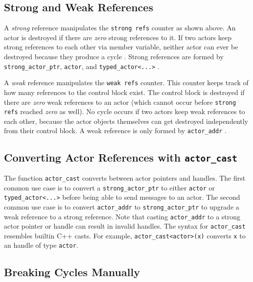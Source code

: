\subsection{Strong and Weak References}

A \emph{strong} reference manipulates the \lstinline^strong refs^ counter as
shown above. An actor is destroyed if there are \emph{zero} strong references
to it. If two actors keep strong references to each other via member variable,
neither actor can ever be destroyed because they produce a cycle
. Strong references are formed by
\lstinline^strong_actor_ptr^, \lstinline^actor^, and
\lstinline^typed_actor<...>^ .

A \emph{weak} reference manipulates the \lstinline^weak refs^ counter. This
counter keeps track of how many references to the control block exist. The
control block is destroyed if there are \emph{zero} weak references to an actor
(which cannot occur before \lstinline^strong refs^ reached \emph{zero} as
well). No cycle occurs if two actors keep weak references to each other,
because the actor objects themselves can get destroyed independently from their
control block.  A weak reference is only formed by \lstinline^actor_addr^
.

\subsection{Converting Actor References with \texttt{actor\_cast}}
\label{actor-cast}

The function \lstinline^actor_cast^ converts between actor pointers and
handles. The first common use case is to convert a \lstinline^strong_actor_ptr^
to either \lstinline^actor^ or \lstinline^typed_actor<...>^ before being able
to send messages to an actor. The second common use case is to convert
\lstinline^actor_addr^ to \lstinline^strong_actor_ptr^ to upgrade a weak
reference to a strong reference. Note that casting \lstinline^actor_addr^ to a
strong actor pointer or handle can result in invalid handles. The syntax for
\lstinline^actor_cast^ resembles builtin C++ casts. For example,
\lstinline^actor_cast<actor>(x)^ converts \lstinline^x^ to an handle of type
\lstinline^actor^.

\subsection{Breaking Cycles Manually}
\label{breaking-cycles}

